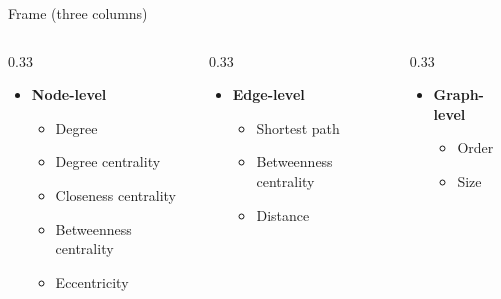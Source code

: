\documentclass[aspectratio=169]{beamer}
\renewcommand{\alert}[1]{\textbf{\color{swufe}#1}}
\begin{document}
        \begin{frame}{Frame (three columns)}
            \begin{columns}[t] %
                \begin{column}{0.33\textwidth}
                    \begin{itemize}
                        \item \alert{Node-level}
                        \begin{itemize}
                            \item Degree
                            \item Degree centrality
                            \item Closeness centrality
                            \item Betweenness centrality
                            \item Eccentricity
                        \end{itemize}
                    \end{itemize}
                \end{column}
                \begin{column}{0.33\textwidth}
                    \begin{itemize}
                        \item \alert{Edge-level}
                        \begin{itemize}
                            \item Shortest path
                            \item Betweenness centrality
                            \item Distance
                        \end{itemize}
                    \end{itemize}
                \end{column}
                \begin{column}{0.33\textwidth}
                    \begin{itemize}
                        \item \alert{Graph-level}
                        \begin{itemize}
                            \item Order
                            \item Size

\end{itemize}
\end{itemize}
\end{column}
\end{columns}
\end{frame}
\end{document}
